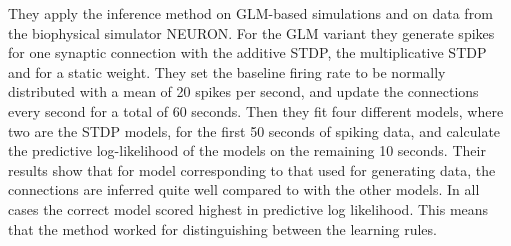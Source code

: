 They apply the inference method on GLM-based simulations and on data from the biophysical simulator NEURON. For the GLM variant they generate spikes for one synaptic connection with the additive STDP, the multiplicative STDP and for a static weight. They set the baseline firing rate to be normally distributed with a mean of 20 spikes per second, and update the connections every second for a total of 60 seconds. Then they fit four different models, where two are the STDP models, for the first 50 seconds of spiking data, and calculate the predictive log-likelihood of the models on the remaining 10 seconds. Their results show that for model corresponding to that used for generating data, the connections are inferred quite well compared to with the other models. In all cases the correct model scored highest in predictive log likelihood. This means that the method worked for distinguishing between the learning rules.













\cleardoublepage